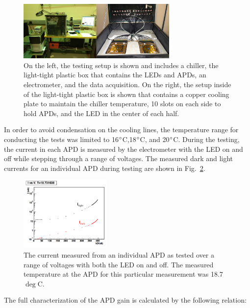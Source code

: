 \documentclass[12pt]{report}
\begin{document}
\begin{figure}[H]
  \centering
      \includegraphics[width=0.7\textwidth]{pics/experiment/apdtests.png}
  \caption[Testing assembly for large area APDs]{On the left, the testing setup is shown and includes a chiller, the light-tight plastic box that contains the LEDs and APDs, an electrometer, and the data acquisition. On the right, the setup inside of the light-tight plastic box is shown that contains a copper cooling plate to maintain the chiller temperature, 10 slots on each side to hold APDs, and the LED in the center of each half.}
  \label{Figure:apdtest}
\end{figure}

In order to avoid condensation on the cooling lines, the temperature range for conducting the tests was limited to 16$\degree$C,18$\degree$C, and 20$\degree$C. During the testing, the current in each APD is measured by the electrometer with the LED on and off while stepping through a range of voltages. The measured dark and light currents for an individual APD during testing are shown in Fig.~\ref{Figure:apdcurrent}.

\begin{figure}[H]
  \centering
      \includegraphics[width=0.4\textwidth]{pics/experiment/apdcurrent.png}
  \caption[APD current draw versus voltage with LED on and off]{The current measured from an individual APD as tested over a range of voltages with both the LED on and off. The measured temperature at the APD for this particular measurement was 18.7~$\deg$C.}
  \label{Figure:apdcurrent}
\end{figure}

The full characterization of the APD gain is calculated by the following relation:
\end{document}
